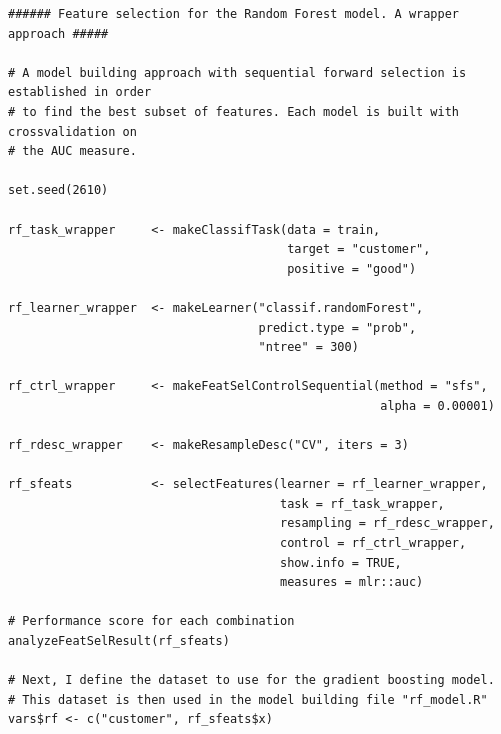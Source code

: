\documentclass[12pt]{article}
\begin{document}
\begin{lstlisting}
###### Feature selection for the Random Forest model. A wrapper approach #####

# A model building approach with sequential forward selection is established in order
# to find the best subset of features. Each model is built with crossvalidation on 
# the AUC measure.

set.seed(2610) 

rf_task_wrapper     <- makeClassifTask(data = train,
                                       target = "customer",
                                       positive = "good")

rf_learner_wrapper  <- makeLearner("classif.randomForest", 
                                   predict.type = "prob",
                                   "ntree" = 300)

rf_ctrl_wrapper     <- makeFeatSelControlSequential(method = "sfs", 
                                                    alpha = 0.00001)

rf_rdesc_wrapper    <- makeResampleDesc("CV", iters = 3)

rf_sfeats           <- selectFeatures(learner = rf_learner_wrapper,
                                      task = rf_task_wrapper,
                                      resampling = rf_rdesc_wrapper,
                                      control = rf_ctrl_wrapper,
                                      show.info = TRUE,
                                      measures = mlr::auc)

# Performance score for each combination
analyzeFeatSelResult(rf_sfeats)

# Next, I define the dataset to use for the gradient boosting model.
# This dataset is then used in the model building file "rf_model.R"
vars$rf <- c("customer", rf_sfeats$x)
\end{lstlisting}
\end{document}
